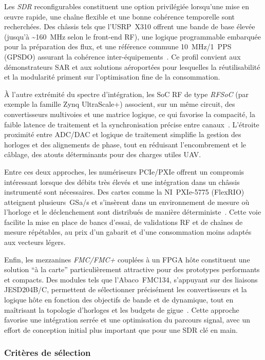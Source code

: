 Les \textit{SDR} reconfigurables constituent une option privilégiée lorsqu’une mise en œuvre rapide, une chaîne flexible et une bonne cohérence temporelle sont recherchées. Des châssis tels que l’USRP~X310 offrent une bande de base élevée (jusqu’à \textasciitilde160~MHz selon le front-end RF), une logique programmable embarquée pour la préparation des flux, et une référence commune 10~MHz/1~PPS (GPSDO) assurant la cohérence inter-équipements~\cite{Ettus_X310_Spec}. Ce profil convient aux démonstrateurs SAR et aux solutions aéroportées pour lesquelles la réutilisabilité et la modularité priment sur l’optimisation fine de la consommation.

À l’autre extrémité du spectre d’intégration, les SoC RF de type \textit{RFSoC} (par exemple la famille Zynq UltraScale+) associent, sur un même circuit, des convertisseurs multivoies et une matrice logique, ce qui favorise la compacité, la faible latence de traitement et la synchronisation précise entre canaux~\cite{AMD_RFSoC_DS889}. L’étroite proximité entre ADC/DAC et logique de traitement simplifie la gestion des horloges et des alignements de phase, tout en réduisant l’encombrement et le câblage, des atouts déterminants pour des charges utiles UAV.

Entre ces deux approches, les numériseurs PCIe/PXIe offrent un compromis intéressant lorsque des débits très élevés et une intégration dans un châssis instrumenté sont nécessaires. Des cartes comme la NI~PXIe-5775 (FlexRIO) atteignent plusieurs~GSa/s et s’insèrent dans un environnement de mesure où l’horloge et le déclenchement sont distribués de manière déterministe~\cite{NI_PXIe5775_Spec}. Cette voie facilite la mise en place de bancs d’essai, de validations RF et de chaînes de mesure répétables, au prix d’un gabarit et d’une consommation moins adaptés aux vecteurs légers.

Enfin, les mezzanines \textit{FMC/FMC+} couplées à un FPGA hôte constituent une solution “à la carte” particulièrement attractive pour des prototypes performants et compacts. Des modules tels que l’Abaco~FMC134, s’appuyant sur des liaisons JESD204B/C, permettent de sélectionner précisément les convertisseurs et la logique hôte en fonction des objectifs de bande et de dynamique, tout en maîtrisant la topologie d’horloges et les budgets de gigue~\cite{Abaco_FMC134}. Cette approche favorise une intégration serrée et une optimisation du parcours signal, avec un effort de conception initial plus important que pour une SDR clé en main.

\subsubsection{Critères de sélection}


